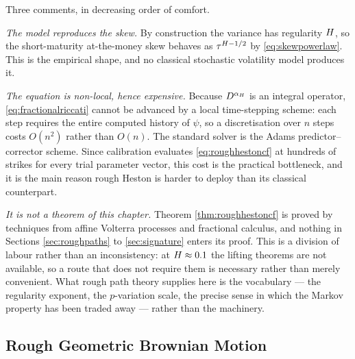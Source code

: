 \begin{remark}\label{rem:roughhestoncost}
Three comments, in decreasing order of comfort.

\emph{The model reproduces the skew.} By construction the variance has regularity $H$, so the
short-maturity at-the-money skew behaves as $\tau^{H-1/2}$ by \eqref{eq:skewpowerlaw}. This is
the empirical shape, and no classical stochastic volatility model produces it.

\emph{The equation is non-local, hence expensive.} Because $D^{\alpha_H}$ is an integral
operator, \eqref{eq:fractionalriccati} cannot be advanced by a local time-stepping scheme: each
step requires the entire computed history of $\psi$, so a discretisation over $n$ steps costs
$O(n^2)$ rather than $O(n)$. The standard solver is the Adams predictor--corrector scheme. Since
calibration evaluates \eqref{eq:roughhestoncf} at hundreds of strikes for every trial parameter
vector, this cost is the practical bottleneck, and it is the main reason rough Heston is harder to
deploy than its classical counterpart.

\emph{It is not a theorem of this chapter.} Theorem \ref{thm:roughhestoncf} is proved by techniques
from affine Volterra processes and fractional calculus, and nothing in Sections \ref{sec:roughpaths}
to \ref{sec:signature} enters its proof. This is a division of labour rather than an inconsistency:
at $H\approx0.1$ the lifting theorems are not available, so a route that does not require them
is necessary rather than merely convenient. What rough path theory supplies here is the vocabulary
--- the regularity exponent, the $p$-variation scale, the precise sense in which the Markov property
has been traded away --- rather than the machinery.
 \end{remark}




\subsection{Rough Geometric Brownian Motion}\label{subsec:roughexample}


